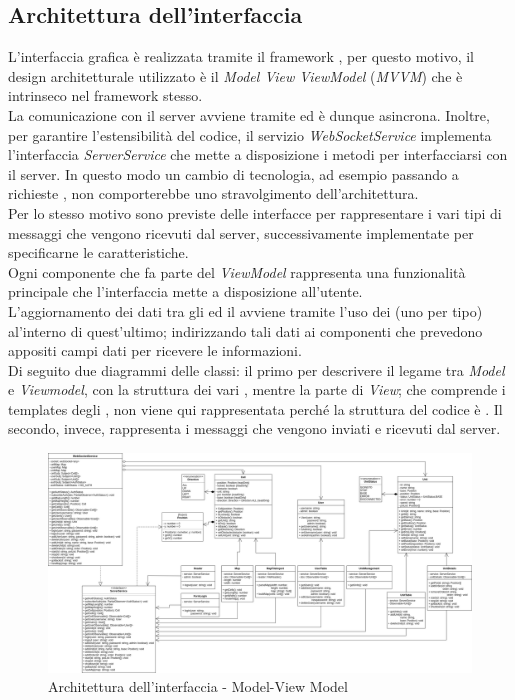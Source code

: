 \subsection{Architettura dell'interfaccia}
	L'interfaccia grafica è realizzata tramite il framework , per questo motivo, il design architetturale utilizzato è il \textit{Model View ViewModel} (\textit{MVVM}) che è intrinseco nel framework stesso. \\
	La comunicazione con il server avviene tramite  ed è dunque asincrona. 
	Inoltre, per garantire l'estensibilità del codice, il servizio \textit{WebSocketService} implementa l'interfaccia \textit{ServerService} che mette a disposizione i metodi per interfacciarsi con il server. In questo modo un cambio di tecnologia, ad esempio passando a richieste , non comporterebbe uno stravolgimento dell'architettura. \\
	Per lo stesso motivo sono previste delle interfacce per rappresentare i vari tipi di messaggi che vengono ricevuti dal server, successivamente implementate per specificarne le caratteristiche. \\
	Ogni componente che fa parte del \textit{ViewModel} rappresenta una funzionalità principale che l'interfaccia mette a disposizione all'utente.\\
	L'aggiornamento dei dati tra gli  ed il  avviene tramite l'uso dei  (uno per tipo) al'interno di quest'ultimo; indirizzando tali dati  ai componenti che prevedono appositi campi dati per ricevere le informazioni.\\
	\newline
	Di seguito due diagrammi delle classi: il primo per descrivere il legame tra \textit{Model} e \textit{Viewmodel}, con la struttura dei vari , mentre la parte di \textit{View}; che comprende i templates degli , non viene qui rappresentata perché la struttura del codice è .
	Il secondo, invece, rappresenta i messaggi che vengono inviati e ricevuti dal server.
	\newpage
	
	\begin{landscape}
		\begin{figure}[h!]
			\includegraphics[width=24cm]{img/ui_component.png}
			\caption{Architettura dell'interfaccia - Model-View Model}
		\end{figure}
	\end{landscape}
	\newpage
	
